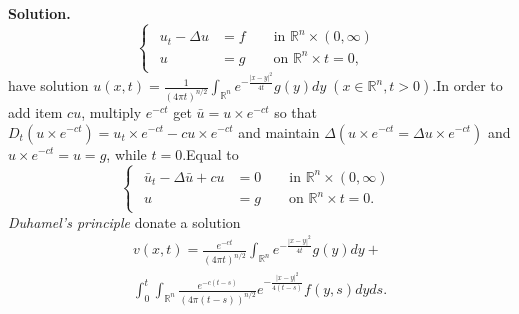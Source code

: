 \documentclass[a4paper]{book}
\newenvironment{solution}%
{\noindent\textbf{Solution.}}%
{\qedhere}
\numberwithin{equation}{chapter}
\theoremstyle{definition}
\begin{document}
\begin{multicols}{2}
\begin{solution}
	\begin{equation}\nonumber
	\begin{cases}
	\begin{aligned} 
	u_t - \Delta u &= f \qquad \text{in } \mathbb{R}^n \times (0, \infty)\\
	u &= g \qquad \text{on } \mathbb{R}^n \times {t = 0},
	\end{aligned}
	\end{cases}
	\end{equation}
	have solution $ u(x,t) = \frac{1}{(4 \pi t)^{n/2}} \int_{\mathbb{R}^n} e^{- \frac{|x-y|^2}{4t}} g(y)dy\; (x \in \mathbb{R}^n , t > 0) $.In order to add item $ cu $, multiply $ e^{-ct} $ get $ \bar{u} = u \times e^{-ct} $ so that $ D_t (u \times e^{-ct}) = u_t \times e^{-ct} - cu \times e^{-ct} $ and maintain $ \Delta (u \times e^{-ct} = \Delta u \times e^{-ct}) $ and $ u \times e^{-ct} = u = g $, while $ t = 0 $.Equal to 
	\begin{equation}\nonumber
	\begin{cases}
	\begin{aligned} 
	\bar{u}_t - \Delta \bar{u} + cu &= 0 \qquad \text{in } \mathbb{R}^n \times (0, \infty)\\
	u &= g \qquad \text{on } \mathbb{R}^n \times {t = 0}.
	\end{aligned}
	\end{cases}
	\end{equation}
	\textit{Duhamel's principle} donate a solution 
	\begin{align*}  
	v(x,t) = \frac{e^{-ct}}{(4 \pi t)^{n/2}} \int_{\mathbb{R}^n} e^{- \frac{|x-y|^2}{4t}} g(y)dy + \\
	 \int_{0}^{t} \int_{\mathbb{R}^n} \frac{e^{-c(t-s)}}{(4 \pi (t-s))^{n/2}} e^{- \frac{|x-y|^2}{4(t-s)}} f(y,s) dyds .
	 \end{align*}
\end{solution}

%

%

%


\end{multicols}
\end{document}
